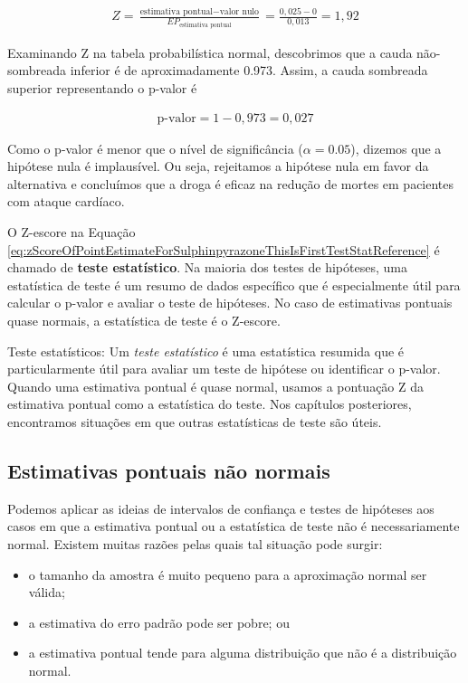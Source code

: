 \documentclass[
]{book}
\theoremstyle{definition}
\theoremstyle{definition}
\theoremstyle{definition}
\theoremstyle{definition}
\theoremstyle{remark}
\begin{document}
\begin{eqnarray}
Z = \frac{\text{estimativa pontual} - \text{valor nulo}}{EP_{\text{estimativa pontual}}}
    = \frac{0,025 - 0}{0,013} = 1,92
\label{eq:zScoreOfPointEstimateForSulphinpyrazoneThisIsFirstTestStatReference}
\end{eqnarray}

Examinando Z na tabela probabilística normal, descobrimos que a cauda não-sombreada inferior é de aproximadamente 0.973. Assim, a cauda sombreada superior representando o p-valor é

\begin{eqnarray*}
\text{p-valor} = 1-0,973 = 0,027
\end{eqnarray*}

Como o p-valor é menor que o nível de significância (\(\alpha = 0.05\)), dizemos que a hipótese nula é implausível. Ou seja, rejeitamos a hipótese nula em favor da alternativa e concluímos que a droga é eficaz na redução de mortes em pacientes com ataque cardíaco.

O Z-escore na Equação \eqref{eq:zScoreOfPointEstimateForSulphinpyrazoneThisIsFirstTestStatReference} é chamado de \textbf{teste estatístico}. Na maioria dos testes de hipóteses, uma estatística de teste é um resumo de dados específico que é especialmente útil para calcular o p-valor e avaliar o teste de hipóteses. No caso de estimativas pontuais quase normais, a estatística de teste é o Z-escore.

Teste estatísticos: Um \emph{teste estatístico} é uma estatística resumida que é particularmente útil para avaliar um teste de hipótese ou identificar o p-valor. Quando uma estimativa pontual é quase normal, usamos a pontuação Z da estimativa pontual como a estatística do teste. Nos capítulos posteriores, encontramos situações em que outras estatísticas de teste são úteis.

\hypertarget{PointEstimatesNotNormal}{%
\subsection{Estimativas pontuais não normais}\label{PointEstimatesNotNormal}}

Podemos aplicar as ideias de intervalos de confiança e testes de hipóteses aos casos em que a estimativa pontual ou a estatística de teste não é necessariamente normal. Existem muitas razões pelas quais tal situação pode surgir:

\begin{itemize}
\item
  o tamanho da amostra é muito pequeno para a aproximação normal ser válida;
\item
  a estimativa do erro padrão pode ser pobre; ou
\item
  a estimativa pontual tende para alguma distribuição que não é a distribuição normal.
\end{itemize}
\end{document}
